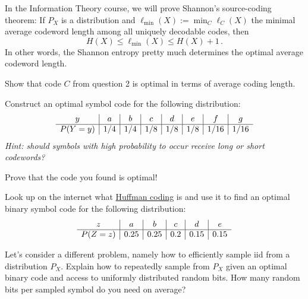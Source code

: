 \documentclass[10pt, a5paper]{scrartcl}
\newcommand{\len}{\ell}
\begin{document}
\begin{exercise}
  In the Information Theory course, we will prove Shannon's source-coding
  theorem: If $P_X$ is a distribution and $\ell_{\min}(X) := \min_C \len_C(X)$
  the minimal average codeword length among all uniquely decodable codes, then
  \[
    H(X) \leq \ell_{\min}(X) \leq H(X)+1 \, .
  \]
  In other words, the Shannon entropy pretty much determines the optimal
  average codeword length.

  \begin{subex}
    Show that code $C$ from question 2 is optimal in terms of average coding
    length.
  \end{subex}
  
  \begin{subex}
    Construct an optimal symbol code for the following distribution:
    \[
      \begin{array}{c | c | c | c | c | c | c | c}
      y & a & b & c & d & e & f & g\\
      \hline
      P(Y=y) & 1/4 & 1/4   & 1/8   & 1/8 & 1/8 & 1/16 & 1/16 \\
      \end{array}
    \]
    \emph{Hint: should symbols with high probability to occur receive long or
    short codewords?}
  \end{subex}
  
  \begin{subex}
    Prove that the code you found is optimal!		
  \end{subex}
  
  \begin{subex} 
    Look up on the internet what
    \href{https://en.wikipedia.org/wiki/Huffman_coding}{Huffman coding} 
    is and use it to find an optimal binary symbol code for the following
    distribution:
    \[
      \begin{array}{c | c | c | c | c | c}
      z & a & b & c & d & e\\
      \hline
      P(Z=z) & 0.25 & 0.25   & 0.2   & 0.15 & 0.15 \\
      \end{array}
    \]
  \end{subex}
\end{exercise}


\begin{exercise}
  Let's consider a different problem, namely how to efficiently sample iid from
  a distribution $P_X$. Explain how to repeatedly sample from $P_X$ given an
  optimal binary code and access to uniformly distributed random bits. How many
  random bits per sampled symbol do you need on average?
\end{exercise}
\end{document}
